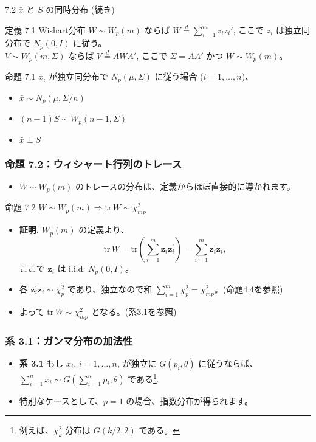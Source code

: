 \documentclass{beamer}
\begin{document}
\begin{frame}{7.2 $\bar{x}$ と $S$ の同時分布 (続き)}
\begin{block}{定義 7.1 Wishart分布}
$W \sim W_p(m)$ ならば $W \overset{d}{=} \sum_{i=1}^{m} z_i z_i'$, ここで $z_i$ は独立同分布で $N_p(0, I)$ に従う。\\
$V \sim W_p(m, \Sigma)$ ならば $V \overset{d}{=} AWA'$, ここで $\Sigma=AA'$ かつ $W \sim W_p(m)$。
\end{block}

\begin{block}{命題 7.1}
$x_i$ が独立同分布で $N_p(\mu, \Sigma)$ に従う場合 ($i=1, \dots, n$)、
\begin{itemize}
    \item $\bar{x} \sim N_p(\mu, \Sigma/n)$ 
    \item $(n-1)S \sim W_p(n-1, \Sigma)$ 
    \item $\bar{x} \perp S$ 
\end{itemize}
\end{block}
\end{frame}

\begin{frame}
\frametitle{命題 7.2：ウィシャート行列のトレース}
\begin{itemize}
    \item $W\sim W_p(m)$ のトレースの分布は、定義からほぼ直接的に導かれます。
\end{itemize}
\begin{block}{命題 7.2} 
    $W\sim W_p(m)\Rightarrow \mathrm{tr}\,W\sim\chi^2_{mp}$
\end{block}
\begin{itemize}
    \item \textbf{証明.} $W_p(m)$ の定義より、
    \[
    \mathrm{tr}\,W = \mathrm{tr}\left(\sum_{i=1}^{m}\bm{z}_{i}\bm{z}_{i}^{\prime}\right) = \sum_{i=1}^{m}\bm{z}_{i}^{\prime}\bm{z}_{i},
    \]
    ここで $\bm{z}_i$ は i.i.d. $N_p(0, I)$。
    \item 各 $\bm{z}_i^{\prime}\bm{z}_i \sim \chi_p^2$ であり、独立なので和 $\sum_{i=1}^m \chi_p^2 = \chi_{mp}^2$。(命題4.4を参照)
    \item よって $\mathrm{tr}\,W \sim \chi_{mp}^2$ となる。(系3.1を参照)
\end{itemize}
\end{frame}

\begin{frame}
\frametitle{系 3.1：ガンマ分布の加法性}
\begin{itemize}
    \item \textbf{系 3.1} もし $x_i$, $i=1,...,n$, が独立に $G(p_i, \theta)$ に従うならば、$\sum_{i=1}^{n}x_i \sim G\left(\sum_{i=1}^{n}p_i, \theta\right)$ である\footnote{例えば、$\chi^2_k$ 分布は $G(k/2, 2)$ である。}.
    \item 特別なケースとして、$p=1$ の場合、指数分布が得られます。
\end{itemize}
\end{frame}
\end{document}
